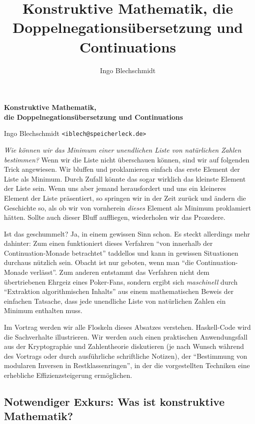 \documentclass[a4paper,ngerman,10pt]{scrartcl}
\title{Konstruktive Mathematik, die Doppelnegationsübersetzung und Continuations}
\author{Ingo Blechschmidt}
\theoremstyle{plain}
\begin{document}
\begin{center}\large\textsf{\textbf{Konstruktive Mathematik, \\ die
Doppelnegationsübersetzung und Continuations}}

\normalsize Ingo Blechschmidt \texttt{<iblech@speicherleck.de>}\end{center}

\emph{Wie können wir das Minimum einer unendlichen Liste von natürlichen
Zahlen bestimmen?} Wenn wir die Liste nicht überschauen können, sind wir auf folgenden Trick
angewiesen. Wir bluffen und proklamieren einfach das erste Element der Liste als
Minimum. Durch Zufall könnte das sogar wirklich das kleinste Element der Liste
sein. Wenn uns aber jemand herausfordert und uns ein kleineres Element der
Liste präsentiert, so springen wir in der Zeit zurück und ändern die Geschichte
so, als ob wir von vornherein \emph{dieses} Element als Minimum proklamiert
hätten. Sollte auch dieser Bluff auffliegen, wiederholen wir das Prozedere.

Ist das geschummelt? Ja, in einem gewissen Sinn schon. Es steckt allerdings
mehr dahinter: Zum einen funktioniert dieses Verfahren "`von innerhalb der
Continuation-Monade betrachtet"' taddellos und kann in gewissen Situationen
durchaus nützlich sein. Obacht ist nur geboten, wenn man "`die
Continuation-Monade verlässt"'. Zum anderen entstammt das Verfahren nicht dem
übertriebenen Ehrgeiz eines Poker-Fans, sondern ergibt sich \emph{maschinell}
durch "`Extraktion algorithmischen Inhalts"' aus einem mathematischen Beweis
der einfachen Tatsache, dass jede unendliche Liste von natürlichen Zahlen ein
Minimum enthalten muss.

Im Vortrag werden wir alle Floskeln dieses Absatzes verstehen. Haskell-Code
wird die Sachverhalte illustrieren. Wir werden auch einen praktischen
Anwendungsfall aus der Kryptographie und Zahlentheorie diskutieren (je nach
Wunsch während des Vortrags oder durch ausführliche schriftliche Notizen), der
"`Bestimmung von modularen Inversen in Restklassenringen"', in der die
vorgestellten Techniken eine erhebliche Effizienzsteigerung ermöglichen.


\subsection*{Notwendiger Exkurs: Was ist konstruktive Mathematik?}
\end{document}
